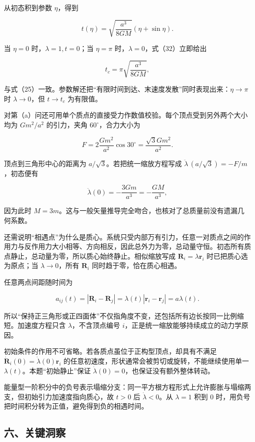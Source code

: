\documentclass[12pt,a4paper,UTF8]{ctexart}
\begin{document}
从初态积到参数 \(\eta\)，得到

\[
t(\eta)=\sqrt{\frac{a^3}{8GM}}
(\eta+\sin\eta). \tag{32}
\]

当 \(\eta=0\) 时，\(\lambda=1,t=0\)；当 \(\eta=\pi\)
时，\(\lambda=0\)，式（32）立即给出

\[
t_c=\pi\sqrt{\frac{a^3}{8GM}},
\]

与式（25）一致。参数解还把``有限时间到达、末速度发散''同时表现出来：\(\eta\to\pi\)
时 \(\lambda\to0\)，但 \(t\to t_c\) 为有限值。

对第（a）问还可用单个质点的直接受力作数值校验。每个顶点受到另外两个大小均为
\(Gm^2/a^2\) 的引力，夹角 \(60^\circ\)，合力大小为

\[
F=2\frac{Gm^2}{a^2}\cos30^\circ
=\frac{\sqrt3Gm^2}{a^2}. \tag{33}
\]

顶点到三角形中心的距离为 \(a/\sqrt3\)。若把统一缩放方程写成
\(\ddot\lambda\,(a/\sqrt3)=-F/m\)，初态便有

\[
\ddot\lambda(0)=-\frac{3Gm}{a^3}=-\frac{GM}{a^3},
\]

因为此时
\(M=3m\)。这与一般矢量推导完全吻合，也核对了总质量前没有遗漏几何系数。

还需说明``相遇点''为什么是质心。系统只受内部万有引力，任意一对质点之间的作用力与反作用力大小相等、方向相反，因此总外力为零，总动量守恒。初态所有质点静止，总动量为零，所以质心始终静止。相似缩放写成
\(\boldsymbol R_i=\lambda\boldsymbol r_i\) 时已把质心选为原点；当
\(\lambda\to0\)，所有 \(\boldsymbol R_i\) 同时趋于零，恰在质心相遇。

任意两点间距随时间为

\[
a_{ij}(t)=|\boldsymbol R_i-\boldsymbol R_j|
=\lambda(t)|\boldsymbol r_i-\boldsymbol r_j|
=a\lambda(t).
\]

所以``保持正三角形或正四面体''不仅指角度不变，还包括所有边长按同一比例缩短。加速度方程只含
\(\lambda\)，不含顶点编号 \(i\)，正是统一缩放能够持续成立的动力学原因。

初始条件的作用不可省略。若各质点虽位于正构型顶点，却具有不满足
\(\dot{\boldsymbol R}_i(0)=\dot\lambda(0)\boldsymbol r_i\)
的任意初速度，形状通常会被剪切或旋转，不能继续使用单一
\(\lambda(t)\)。本题``初始静止''保证
\(\dot\lambda(0)=0\)，也保证没有额外整体转动。

能量型一阶积分中的负号表示塌缩分支：同一平方根方程形式上允许膨胀与塌缩两支，但初始引力加速度指向质心，故
\(t>0\) 后 \(\dot\lambda<0\)。从 \(\lambda=1\) 积到 \(0\)
时，用负号把时间积分转为正值，避免得到负的相遇时间。

\subsection{六、关键洞察}\label{ux516dux5173ux952eux6d1eux5bdf-1}
\end{document}
